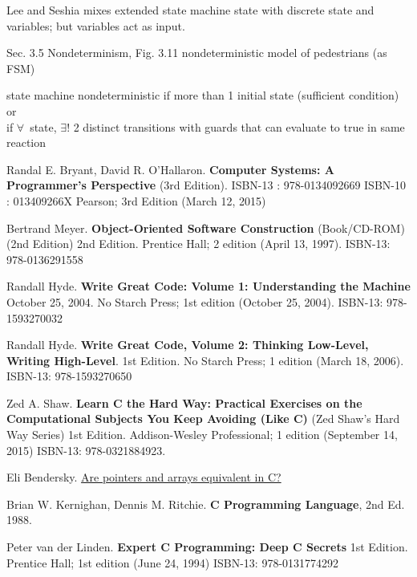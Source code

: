 \documentclass[10pt]{amsart}
\begin{document}
\begin{multicols*}{2}
Lee and Seshia mixes extended state machine state with discrete state and variables; but variables act as input.

Sec. 3.5 Nondeterminism, Fig. 3.11 nondeterministic model of pedestrians (as FSM)

state machine nondeterministic if more than 1 initial state (sufficient condition) or \\
if $\forall \,$ state, $\exists !$ 2 distinct transitions with guards that can evaluate to true in same reaction \\




\end{multicols*}

\begin{thebibliography}{9}

Randal E. Bryant, David R. O'Hallaron. \textbf{Computer Systems: A Programmer's Perspective} (3rd Edition). ISBN-13 : 978-0134092669
ISBN-10 : 013409266X
 Pearson; 3rd Edition (March 12, 2015) 

Bertrand Meyer. \textbf{Object-Oriented Software Construction} (Book/CD-ROM) (2nd Edition) 2nd Edition.   Prentice Hall; 2 edition (April 13, 1997).  ISBN-13: 978-0136291558

Randall Hyde.  \textbf{Write Great Code: Volume 1: Understanding the Machine} October 25, 2004.  No Starch Press; 1st edition (October 25, 2004).  ISBN-13: 978-1593270032

Randall Hyde.  \textbf{Write Great Code, Volume 2: Thinking Low-Level, Writing High-Level}.   1st Edition.  No Starch Press; 1 edition (March 18, 2006).  ISBN-13: 978-1593270650

Zed A. Shaw.  \textbf{Learn C the Hard Way: Practical Exercises on the Computational Subjects You Keep Avoiding (Like C)} (Zed Shaw's Hard Way Series) 1st Edition.  Addison-Wesley Professional; 1 edition (September 14, 2015) ISBN-13: 978-0321884923.  

Eli Bendersky.   \href{https://eli.thegreenplace.net/2009/10/21/are-pointers-and-arrays-equivalent-in-c}{Are pointers and arrays equivalent in C?}

Brian W. Kernighan, Dennis M. Ritchie.  \textbf{C Programming Language}, 2nd Ed. 1988.   

Peter van der Linden.  \textbf{Expert C Programming: Deep C Secrets} 1st Edition.  Prentice Hall; 1st edition (June 24, 1994)  ISBN-13: 978-0131774292


\end{thebibliography}
\end{document}

